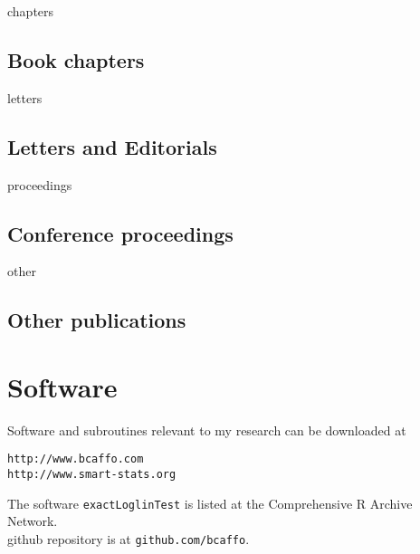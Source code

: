 \documentclass[12pt]{article}
\begin{document}
\begin{btSect}{chapters}
\subsection*{Book chapters}
\btPrintNotCited
\end{btSect}

\begin{btSect}{letters}
\subsection*{Letters and Editorials}
\btPrintNotCited
\end{btSect}

\begin{btSect}{proceedings}
\subsection*{Conference proceedings}
\btPrintNotCited
\end{btSect}

\begin{btSect}{other}
\subsection*{Other publications}
\btPrintNotCited
\end{btSect}


\section*{Software}
Software and subroutines relevant to my research can be downloaded at 
 \begin{verbatim}
http://www.bcaffo.com
http://www.smart-stats.org
\end{verbatim}
The software \texttt{exactLoglinTest} is listed at the Comprehensive R Archive Network. \\
github repository is at \texttt{github.com/bcaffo}.
\end{document}
